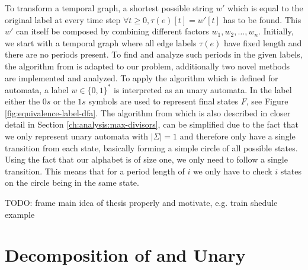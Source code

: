 To transform a temporal graph, a shortest possible string $w'$ which is equal to the original label at every time step $\forall t \geq 0, \tau(e)[t] = w'[t]$ has to be found. This $w'$ can itself be composed by combining different factors $w_1,w_2,\dots,w_n$. Initially, we start with a temporal graph where all edge labels $\tau(e)$ have fixed length and there are no periods present. To find and analyze such periods in the given labels, the algorithm from \cite{DBLP:journals/corr/abs-2107-04683} is adapted to our problem, additionally two novel methods are implemented and analyzed. To apply the algorithm which is defined for automata, a label $ w \in \{0,1\}^*$ is interpreted as an unary automata. In the label either the $0s$ or the $1s$ symbols are used to represent final states $F$, see Figure \ref{fig:equivalence-label-dfa}. The algorithm from \cite{DBLP:journals/corr/abs-2107-04683} which is also described in closer detail in Section \ref{ch:analysis:max-divisors}, can be simplified due to the fact that we only represent unary automata with \textbf{$|\Sigma| = 1$} and therefore only have a single transition from each state, basically forming a simple circle of all possible states. Using the fact that our alphabet is of size one, we only need to follow a single transition. This means that for a period length of $i$ we only have to check $i$ states on the circle being in the same state.

TODO: frame main idea of thesis properly and motivate, e.g. train shedule example

\section{Decomposition of \DFAs and Unary \DFAs}
\label{ch:analysis:decomposition-unary-dfas}

